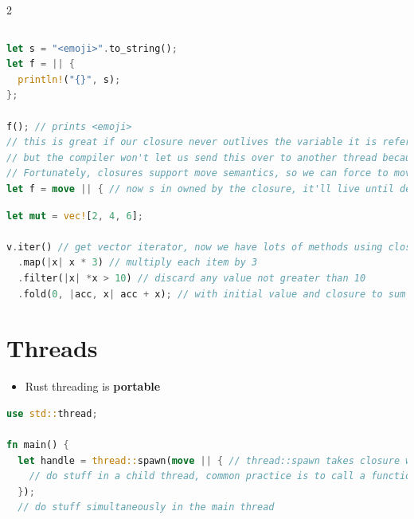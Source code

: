 \documentclass{report}
\begin{document}
\begin{multicols*}{2}
\begin{tcolorbox}[title=Syntax,colback=backcolour,size=small,left=4mm]
\begin{lstlisting}[language=rust]
\end{lstlisting}
\end{tcolorbox}

\begin{tcolorbox}[title=Example of closure borrowing,colback=backcolour,size=small,left=4mm]
\begin{lstlisting}[language=rust]
let s = "<emoji>".to_string();
let f = || {
  println!("{}", s);
};

f(); // prints <emoji>
// this is great if our closure never outlives the variable it is referencing,
// but the compiler won't let us send this over to another thread because it might longer than this thread
// Fortunately, closures support move semantics, so we can force to move any var it uses into itself and take ownership of them
let f = move || { // now s in owned by the closure, it'll live until death of the closure
\end{lstlisting}
\end{tcolorbox}

\begin{tcolorbox}[title=Functionnal Programming Example,colback=backcolour,size=small,left=4mm]
\begin{lstlisting}[language=rust]
let mut = vec![2, 4, 6];

v.iter() // get vector iterator, now we have lots of methods using closures available
  .map(|x| x * 3) // multiply each item by 3
  .filter(|x| *x > 10) // discard any value not greater than 10
  .fold(0, |acc, x| acc + x); // with initial value and closure to sum remaining values together
\end{lstlisting}
\end{tcolorbox}


\section{Threads}

\begin{itemize}
  \item Rust threading is \textbf{portable}
\end{itemize}

\begin{tcolorbox}[title=Fully functional example,colback=backcolour,size=small,left=4mm]
\begin{lstlisting}[language=rust]
use std::thread;

fn main() {
  let handle = thread::spawn(move || { // thread::spawn takes closure w/o args, closure gets exec as the main function of the thread
    // do stuff in a child thread, common practice is to call a function here
  });
  // do stuff simultaneously in the main thread


\end{lstlisting}
\end{tcolorbox}
\end{multicols*}
\end{document}
